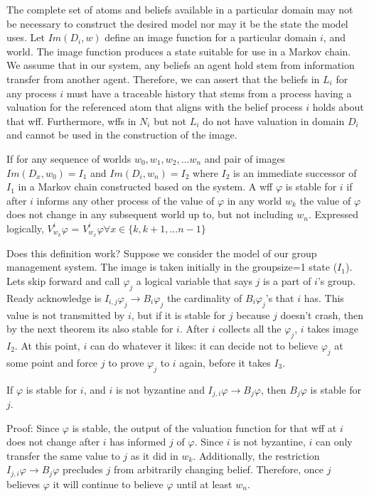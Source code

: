 The complete set of atoms and beliefs available in a particular domain may not be necessary to construct the desired model nor may it be the state the model uses. Let $Im(D_i, w)$ define an image function for a particular domain $i$, and world. The image function produces a state suitable for use in a Markov chain. We assume that in our system, any beliefs an agent hold stem from information transfer from another agent. Therefore, we can assert that the beliefs in $L_i$ for any process $i$ must have a traceable history that stems from a process having a valuation for the referenced atom that aligns with the belief process $i$ holds about that wff. Furthermore, wffs in $N_i$ but not $L_i$ do not have valuation in domain $D_i$ and cannot be used in the construction of the image.

\begin{pdef}
If for any sequence of worlds $w_0, w_1, w_2, ... w_n$ and pair of images $Im(D_x, w_0)=I_1$ and $Im(D_i, w_n)=I_2$ where $I_2$ is an immediate successor of $I_1$ in a Markov chain constructed based on the system. A wff $\varphi$ is stable for $i$ if after $i$ informs any other process of the value of $\varphi$ in any world $w_k$ the value of $\varphi$ does not change in any subsequent world up to, but not including $w_n$. Expressed logically, $V^i_{w_k} \varphi$ = $V^i_{w_x} \varphi \forall x \in \{k, k+1, ... n-1\}$
\end{pdef}

Does this definition work? Suppose we consider the model of our group management system. The image is taken initially in the groupsize=1 state ($I_1$). Lets skip forward and call $\varphi_j$ a logical variable that says $j$ is a part of $i$'s group. Ready acknowledge is $I_{i,j} \varphi_j \rightarrow B_i \varphi_j$ the cardinality of $B_i \varphi_j$'s that $i$ has. This value is not transmitted by $i$, but if it is stable for $j$ because $j$ doesn't crash, then by the next theorem its also stable for $i$. After $i$ collects all the $\varphi_j$, $i$ takes image $I_2$. At this point, $i$ can do whatever it likes: it can decide not to believe $\varphi_j$ at some point and force $j$ to prove $\varphi_j$ to $i$ again, before it takes $I_3$.

\begin{thm}
If $\varphi$ is stable for $i$, and $i$ is not byzantine and $I_{j,i} \varphi \rightarrow B_j \varphi$, then $B_j \varphi$ is stable for $j$.
\end{thm}

Proof: Since $\varphi$ is stable, the output of the valuation function for that wff at $i$ does not change after $i$ has informed $j$ of $\varphi$. Since $i$ is not byzantine, $i$ can only transfer the same value to $j$ as it did in $w_k$. Additionally, the restriction $I_{j,i} \varphi \rightarrow B_j \varphi$ precludes $j$ from arbitrarily changing belief. Therefore, once $j$ believes $\varphi$ it will continue to believe $\varphi$ until at least $w_n$.

